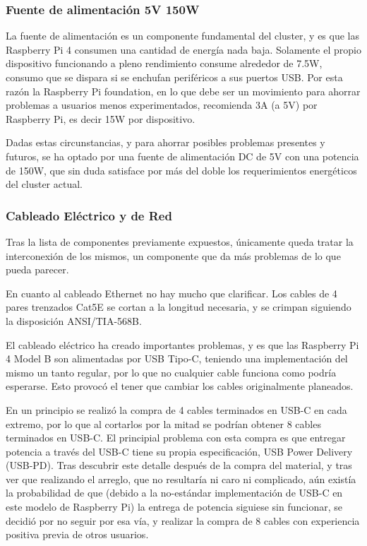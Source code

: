 
\subsubsection{Fuente de alimentación 5V 150W}
La fuente de alimentación es un componente fundamental del cluster, y es que las Raspberry Pi 4 consumen una cantidad de energía nada baja. Solamente el propio dispositivo funcionando a pleno rendimiento consume alrededor de 7.5W, consumo que se dispara si se enchufan periféricos a sus puertos USB. Por esta razón la Raspberry Pi foundation, en lo que debe ser un movimiento para ahorrar problemas a usuarios menos experimentados, recomienda 3A (a 5V) por Raspberry Pi, es decir 15W por dispositivo.

Dadas estas circunstancias, y para ahorrar posibles problemas presentes y futuros, se ha optado por una fuente de alimentación DC de 5V con una potencia de 150W, que sin duda satisface por más del doble los requerimientos energéticos del cluster actual.


\subsubsection{Cableado Eléctrico y de Red}
Tras la lista de componentes previamente expuestos, únicamente queda tratar la interconexión de los mismos, un componente que da más problemas de lo que pueda parecer.

En cuanto al cableado Ethernet no hay mucho que clarificar. Los cables de 4 pares trenzados Cat5E se cortan a la longitud necesaria, y se crimpan siguiendo la disposición ANSI/TIA-568B.

El cableado eléctrico ha creado importantes problemas, y es que las Raspberry Pi 4 Model B son alimentadas por USB Tipo-C, teniendo una implementación del mismo un tanto regular, por lo que no cualquier cable funciona como podría esperarse. Esto provocó el tener que cambiar los cables originalmente planeados.

En un principio se realizó la compra de 4 cables terminados en USB-C en cada extremo, por lo que al cortarlos por la mitad se podrían obtener 8 cables terminados en USB-C. El principial problema con esta compra es que entregar potencia a través del USB-C tiene su propia especificación, USB Power Delivery (USB-PD). Tras descubrir este detalle después de la compra del material, y tras ver que realizando el arreglo, que no resultaría ni caro ni complicado, aún existía la probabilidad de que (debido a la no-estándar implementación de USB-C en este modelo de Raspberry Pi) la entrega de potencia siguiese sin funcionar, se decidió por no seguir por esa vía, y realizar la compra de 8 cables con experiencia positiva previa de otros usuarios. 

